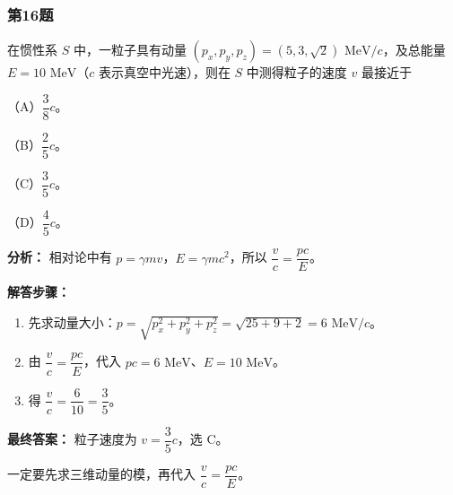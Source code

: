 \documentclass[12pt,a4paper]{ctexart}
\begin{document}
\subsubsection*{第16题}
\begin{tcolorbox}[colback=gray!2!white,colframe=black!60,title={题目}]
在惯性系 \(S\) 中，一粒子具有动量 \((p_x,p_y,p_z)=(5,3,\sqrt{2})\text{ MeV}/c\)，及总能量 \(E=10\text{ MeV}\)（\(c\) 表示真空中光速），则在 \(S\) 中测得粒子的速度 \(v\) 最接近于\par
（A）\(\dfrac{3}{8}c\)。\par
（B）\(\dfrac{2}{5}c\)。\par
（C）\(\dfrac{3}{5}c\)。\par
（D）\(\dfrac{4}{5}c\)。\par
\end{tcolorbox}
\begin{tcolorbox}[colback=blue!2!white,colframe=blue!55!black,title={完整答案}]
\textbf{分析：}
相对论中有 \(p=\gamma mv\)，\(E=\gamma mc^2\)，所以 \(\dfrac{v}{c}=\dfrac{pc}{E}\)。\par
\textbf{解答步骤：}
\begin{enumerate}
\item 先求动量大小：\(p=\sqrt{p_x^2+p_y^2+p_z^2}=\sqrt{25+9+2}=6\text{ MeV}/c\)。
\item 由 \(\dfrac{v}{c}=\dfrac{pc}{E}\)，代入 \(pc=6\text{ MeV}\)、\(E=10\text{ MeV}\)。
\item 得 \(\dfrac{v}{c}=\dfrac{6}{10}=\dfrac{3}{5}\)。
\end{enumerate}
\textbf{最终答案：}
粒子速度为 \(v=\dfrac{3}{5}c\)，选 C。\par
\end{tcolorbox}
\begin{tcolorbox}[colback=red!2!white,colframe=red!55!black,title={易错点}]
一定要先求三维动量的模，再代入 \(\dfrac{v}{c}=\dfrac{pc}{E}\)。\par
\end{tcolorbox}
\end{document}
